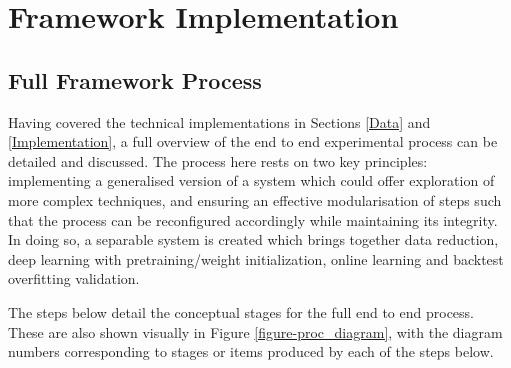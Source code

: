 \documentclass[a4paper,11pt,oneside]{article}
\theoremstyle{plain}
\theoremstyle{definition}
\begin{document}
		
		
	\newpage	
	\section{Framework Implementation}\label{imp_proc}
	
	\subsection{Full Framework Process}\label{imp_fullproc}
	
	Having covered the technical implementations in Sections \ref{Data} and \ref{Implementation}, a full overview of the end to end experimental process can be detailed and discussed. The process here rests on two key principles: implementing a generalised version of a system which could offer exploration of more complex techniques, and ensuring an effective modularisation of steps such that the process can be reconfigured accordingly while maintaining its integrity. In doing so, a separable system is created which brings together data reduction, deep learning with pretraining/weight initialization, online learning and backtest overfitting validation.\newline 

	The steps below detail the conceptual stages for the full end to end process. These are also shown visually in Figure \ref{figure-proc_diagram}, with the diagram numbers corresponding to stages or items produced by each of the steps below.
	
\end{document}
